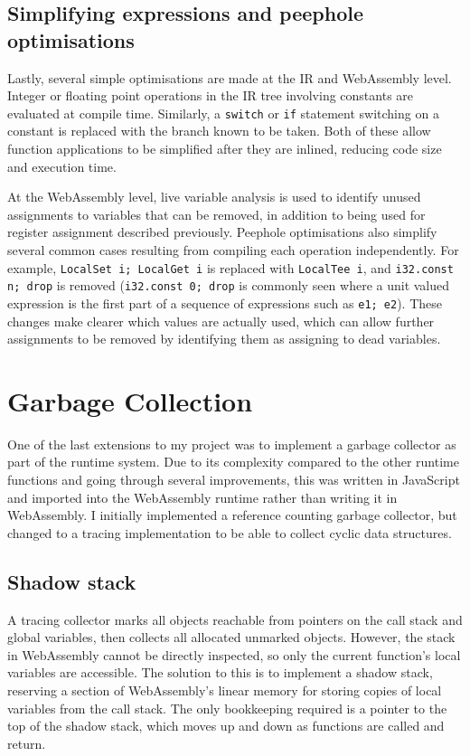 

\subsection{Simplifying expressions and peephole optimisations}
Lastly, several simple optimisations are made at the IR and WebAssembly level. Integer or floating point operations in the IR tree involving constants are evaluated at compile time. Similarly, a \verb|switch| or \verb|if| statement switching on a constant is replaced with the branch known to be taken. Both of these allow function applications to be simplified after they are inlined, reducing code size and execution time. 

At the WebAssembly level, live variable analysis is used to identify unused assignments to variables that can be removed, in addition to being used for register assignment described previously. Peephole optimisations also simplify several common cases resulting from compiling each operation independently. For example, \verb|LocalSet i; LocalGet i| is replaced with \verb|LocalTee i|, and \verb|i32.const n; drop| is removed (\verb|i32.const 0; drop| is commonly seen where a unit valued expression is the first part of a sequence of expressions such as \verb|e1; e2|). These changes make clearer which values are actually used, which can allow further assignments to be removed by identifying them as assigning to dead variables.


\section{Garbage Collection}
One of the last extensions to my project was to implement a garbage collector as part of the runtime system. Due to its complexity compared to the other runtime functions and going through several improvements, this was written in JavaScript and imported into the WebAssembly runtime rather than writing it in WebAssembly. I initially implemented a reference counting garbage collector, but changed to a tracing implementation to be able to collect cyclic data structures.


\subsection{Shadow stack}
A tracing collector marks all objects reachable from pointers on the call stack and global variables, then collects all allocated unmarked objects. However, the stack in WebAssembly cannot be directly inspected, so only the current function's local variables are accessible. The solution to this is to implement a shadow stack, reserving a section of WebAssembly's linear memory for storing copies of local variables from the call stack. The only bookkeeping required is a pointer to the top of the shadow stack, which moves up and down as functions are called and return.

